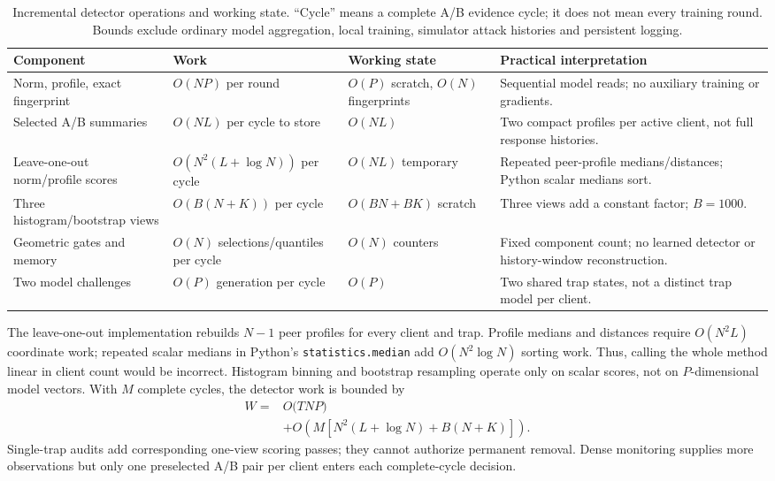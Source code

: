 \documentclass[conference]{IEEEtran}
\begin{document}
\begin{table}[t]\centering\footnotesize
\caption{Incremental detector operations and working state. ``Cycle'' means a complete A/B evidence cycle; it does not mean every training round. Bounds exclude ordinary model aggregation, local training, simulator attack histories and persistent logging.}\label{tab:complexity}
\begin{tabular}{p{3.6cm}p{3.6cm}p{3.0cm}p{5.3cm}}\toprule
Component & Work & Working state & Practical interpretation \\ \midrule
Norm, profile, exact fingerprint & $O(NP)$ per round & $O(P)$ scratch, $O(N)$ fingerprints & Sequential model reads; no auxiliary training or gradients. \\
Selected A/B summaries & $O(NL)$ per cycle to store & $O(NL)$ & Two compact profiles per active client, not full response histories. \\
Leave-one-out norm/profile scores & $O(N^2(L+\log N))$ per cycle & $O(NL)$ temporary & Repeated peer-profile medians/distances; Python scalar medians sort. \\
Three histogram/bootstrap views & $O(B(N+K))$ per cycle & $O(BN+BK)$ scratch & Three views add a constant factor; $B=1000$. \\
Geometric gates and memory & $O(N)$ selections/quantiles per cycle & $O(N)$ counters & Fixed component count; no learned detector or history-window reconstruction. \\
Two model challenges & $O(P)$ generation per cycle & $O(P)$ & Two shared trap states, not a distinct trap model per client. \\
\bottomrule\end{tabular}\end{table}

The leave-one-out implementation rebuilds $N-1$ peer profiles for every
client and trap. Profile medians and distances require $O(N^2L)$ coordinate
work; repeated scalar medians in Python's \texttt{statistics.median} add
$O(N^2\log N)$ sorting work. Thus, calling the whole method linear in client
count would be incorrect. Histogram binning and bootstrap resampling operate
only on scalar scores, not on $P$-dimensional model vectors. With $M$ complete
cycles, the detector work is bounded by
\begin{equation}
\begin{aligned}
 W={}&O\bigl(TNP\bigr)\\
 &+O\!\left(M\left[N^2(L+\log N)+B(N+K)\right]\right).
\end{aligned}
\end{equation}
Single-trap audits add corresponding one-view scoring passes; they cannot
authorize permanent removal. Dense monitoring supplies more observations but
only one preselected A/B pair per client enters each complete-cycle decision.
\end{document}
